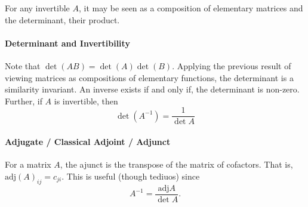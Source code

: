 For any invertible \( A \), it may be seen as a
composition of elementary matrices and the determinant,
their product.

\paragraph{Determinant and Invertibility}
Note that \( \det(AB) = \det(A) \det(B) \).
Applying the previous result of viewing matrices as
compositions of elementary functions, the determinant is
a similarity invariant.
An inverse exists if and only if, the determinant is non-zero.
Further, if \( A \) is invertible, then \[
    \det (A^{-1}) = \frac{1}{\det A}
\]

\paragraph{Adjugate / Classical Adjoint / Adjunct}
For a matrix \( A \), the ajunct is the transpose of the
matrix of cofactors. That is, \( \mathrm{adj}(A)_{ij} = c_{ji} \).
This is useful (though tediuos) since \[
    A^{-1} = \frac{\textrm{adj} A}{\det A}
.\]

